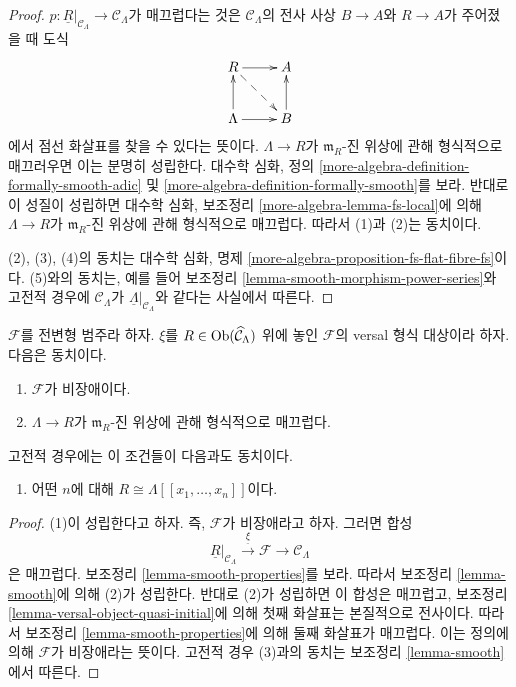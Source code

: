 \begin{proof}
$p : \underline{R}|_{\mathcal{C}_\Lambda} \to \mathcal{C}_\Lambda$가
매끄럽다는 것은 $\mathcal{C}_\Lambda$의 전사 사상 $B \to A$와
$R \to A$가 주어졌을 때 도식
$$
\xymatrix{
R \ar[r] \ar@{-->}[rd] & A \\
\Lambda \ar[r] \ar[u] & B \ar[u]
}
$$
에서 점선 화살표를 찾을 수 있다는 뜻이다. $\Lambda \to R$가
$\mathfrak m_R$-진 위상에 관해 형식적으로 매끄러우면 이는 분명히
성립한다. 대수학 심화, 정의
\ref{more-algebra-definition-formally-smooth-adic} 및
\ref{more-algebra-definition-formally-smooth}를 보라. 반대로 이 성질이
성립하면 대수학 심화, 보조정리
\ref{more-algebra-lemma-fs-local}에 의해 $\Lambda \to R$가
$\mathfrak m_R$-진 위상에 관해 형식적으로 매끄럽다. 따라서 (1)과
(2)는 동치이다.

\medskip\noindent
(2), (3), (4)의 동치는 대수학 심화, 명제
\ref{more-algebra-proposition-fs-flat-fibre-fs}이다. (5)와의 동치는,
예를 들어 보조정리 \ref{lemma-smooth-morphism-power-series}와 고전적
경우에 $\mathcal{C}_\Lambda$가
$\underline{\Lambda}|_{\mathcal{C}_\Lambda}$와 같다는 사실에서 따른다.
\end{proof}

\begin{lemma}
\label{lemma-smooth-power-series-classical}
$\mathcal{F}$를 전변형 범주라 하자. $\xi$를
$R \in \mathop{\mathrm{Ob}}\nolimits(\widehat{\mathcal{C}}_\Lambda)$ 위에 놓인
$\mathcal{F}$의 versal 형식 대상이라 하자. 다음은 동치이다.
\begin{enumerate}
\item $\mathcal{F}$가 비장애이다.
\item $\Lambda \to R$가 $\mathfrak m_R$-진 위상에 관해 형식적으로
매끄럽다.
\end{enumerate}
고전적 경우에는 이 조건들이 다음과도 동치이다.
\begin{enumerate}
\item[(3)] 어떤 $n$에 대해
$R \cong \Lambda[[x_1, \ldots, x_n]]$이다.\ %
\end{enumerate}
\end{lemma}

\begin{proof}
(1)이 성립한다고 하자. 즉, $\mathcal{F}$가 비장애라고 하자. 그러면 합성
$$
\underline{R}|_{\mathcal{C}_\Lambda}
\xrightarrow{\underline{\xi}}
\mathcal{F}
\to
\mathcal{C}_\Lambda
$$
은 매끄럽다. 보조정리 \ref{lemma-smooth-properties}를 보라. 따라서
보조정리 \ref{lemma-smooth}에 의해 (2)가 성립한다. 반대로 (2)가
성립하면 이 합성은 매끄럽고, 보조정리
\ref{lemma-versal-object-quasi-initial}에 의해 첫째 화살표는
본질적으로 전사이다. 따라서 보조정리 \ref{lemma-smooth-properties}에
의해 둘째 화살표가 매끄럽다. 이는 정의에 의해 $\mathcal{F}$가
비장애라는 뜻이다. 고전적 경우 (3)과의 동치는 보조정리
\ref{lemma-smooth}에서 따른다.
\end{proof}

